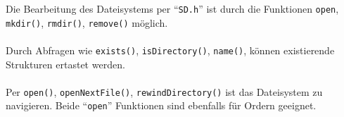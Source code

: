 \documentclass[ngerman]{schoolPres}
\begin{document}
  \begin{frame}
    Die Bearbeitung des Dateisystems per \enquote{\texttt{SD.h}} ist durch die Funktionen \texttt{open}, \texttt{mkdir()}, \texttt{rmdir()}, \texttt{remove()} möglich.\\~\\

    Durch Abfragen wie \texttt{exists()}, \texttt{isDirectory()}, \texttt{name()}, können existierende Strukturen ertastet werden.\\~\\

    Per \texttt{open()}, \texttt{openNextFile()}, \texttt{rewindDirectory()} ist das Dateisystem zu navigieren. Beide \enquote{\texttt{open}} Funktionen sind ebenfalls für Ordern geeignet.

  \end{frame}
\end{document}
